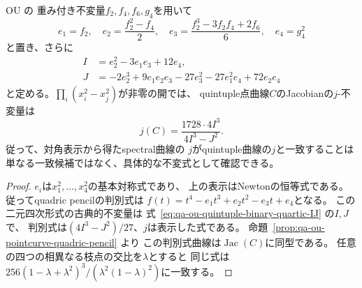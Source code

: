 \begin{corollary}
\label{cor:qa-ou-quintuple-j-invariants}
OU \cite[\S3, (3.12)--(3.16)]{OU2014} の
重み付き不変量$f_2,f_4,f_6,g_4$を用いて
\[
 e_1=f_2,\quad e_2=\frac{f_2^2-f_4}{2},\quad
 e_3=\frac{f_2^3-3f_2f_4+2f_6}{6},\quad
 e_4=g_4^2
\]
と置き、さらに
\[
 \begin{split}
 I&=e_2^2-3e_1e_3+12e_4,\\
 J&=-2e_2^3+9e_1e_2e_3-27e_3^2
       -27e_1^2e_4+72e_2e_4
 \end{split}
 \tag{OU-IJ}\label{eq:qa-ou-quintuple-binary-quartic-IJ}
\]
と定める。$\prod_i(x_i^2-x_j^2)$が非零の開では、
quintuple点曲線$C$のJacobianの$j$-不変量は
\[
 j(C)=\frac{1728\cdot4I^3}{4I^3-J^2}.
 \tag{OU-j}\label{eq:qa-ou-quintuple-j}
\]
従って、対角表示から得たspectral曲線の
$j$がquintuple曲線の$j$と一致することは
単なる一致候補ではなく、具体的な不変式として確認できる。
\end{corollary}
\begin{proof}
$e_i$は$x_1^2,\ldots,x_4^2$の基本対称式であり、
上の表示はNewtonの恒等式である。
従ってquadric pencilの判別式は
$f(t)=t^4-e_1t^3+e_2t^2-e_3t+e_4$となる。
この二元四次形式の古典的不変量は
式~\eqref{eq:qa-ou-quintuple-binary-quartic-IJ} の$I,J$で、
判別式は$(4I^3-J^2)/27$、$j$は表示した式である。
命題~\ref{prop:qa-ou-pointcurve-quadric-pencil} より
この判別式曲線は$\operatorname{Jac}(C)$に同型である。
任意の四つの相異なる枝点の交比を$\lambda$とすると
同じ式は
$256(1-\lambda+\lambda^2)^3/
 (\lambda^2(1-\lambda)^2)$に一致する。
\end{proof}

